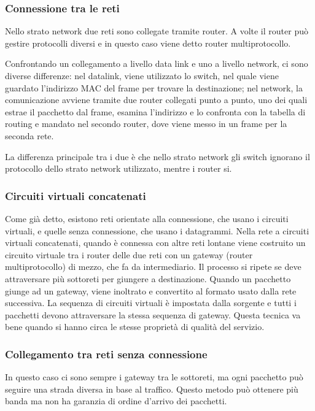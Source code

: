 \subsubsection{Connessione tra le reti}
Nello strato network due reti sono collegate tramite router.
A volte il router può gestire protocolli diversi e in questo caso viene detto router multiprotocollo.

Confrontando un collegamento a livello data link e uno a livello network, ci sono diverse differenze:
nel datalink, viene utilizzato lo switch, nel quale viene guardato l'indirizzo MAC del frame per trovare la destinazione;
nel network, la comunicazione avviene tramite due router collegati punto a punto, uno dei quali estrae il pacchetto dal frame, esamina l'indirizzo e lo confronta con la tabella di routing e mandato nel secondo router, dove viene messo in un frame per la seconda rete.

La differenza principale tra i due è che nello strato network gli switch ignorano il protocollo dello strato network utilizzato, mentre i router si.

\subsubsection{Circuiti virtuali concatenati}
Come già detto, esistono reti orientate alla connessione, che usano i circuiti virtuali, e quelle senza connessione, che usano i datagrammi.
Nella rete a circuiti virtuali concatenati, quando è connessa con altre reti lontane viene costruito un circuito virtuale tra i router delle due reti con un gateway (router multiprotocollo) di mezzo, che fa da intermediario.
Il processo si ripete se deve attraversare più sottoreti per giungere a destinazione.
Quando un pacchetto giunge ad un gateway, viene inoltrato e convertito al formato usato dalla rete successiva.
La sequenza di circuiti virtuali è impostata dalla sorgente e tutti i pacchetti devono attraversare la stessa sequenza di gateway.
Questa tecnica va bene quando si hanno circa le stesse proprietà di qualità del servizio.

\subsubsection{Collegamento tra reti senza connessione}
In questo caso ci sono sempre i gateway tra le sottoreti, ma ogni pacchetto può seguire una strada diversa in base al traffico.
Questo metodo può ottenere più banda ma non ha garanzia di ordine d'arrivo dei pacchetti.

